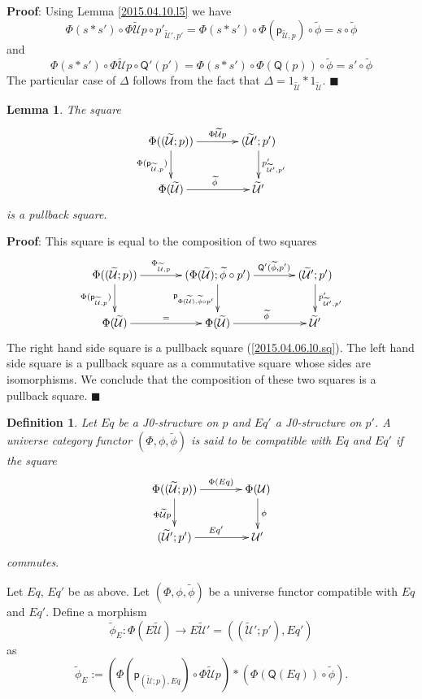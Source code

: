\documentclass[12pt]{article}
\numberwithin{equation}{section}
\newenvironment{eq}{\begin{equation}}{\end{equation}}
\newenvironment{myproof}{{\bf Proof}:}{$\blacksquare$ \vskip 5mm }
\newtheorem{lemma}[proposition]{Lemma}
\newtheorem{definition}[proposition]{Definition}
\newcommand{\sr}{\rightarrow}
\newcommand{\wt}{\widetilde}
\newcommand{\id}{1}            %
\newcommand{\p}{\mathsf{p}}
\newcommand{\U}{\mathcal{U}}
\newcommand{\Q}{\mathsf{Q}}
\begin{document}
%
\begin{myproof}
Using Lemma \ref{2015.04.10.l5} we have
%
$$\Phi(s*s')\circ \Phi\wt{\U}p\circ
p'_{\wt{\U}',p'}=\Phi(s*s')\circ\Phi(\p_{\wt{\U},p})\circ\wt{\phi}=s\circ
\wt{\phi}$$
%
and
%
$$\Phi(s*s')\circ \Phi\wt{\U}p\circ \Q'(p')=\Phi(s*s')\circ \Phi(\Q(p))\circ
\wt{\phi}=s'\circ\wt{\phi}$$
%
The particular case of $\Delta$ follows from the fact that
$\Delta=\id_{\wt{\U}}*\id_{\wt{\U}}$.
\end{myproof}
%
\begin{lemma}
\label{2015.04.06.l5} The square
%
\begin{eq}\label{2015.04.06.eq10-bis}
\begin{xy}
          \xymatrix@C=3pc{ \Phi((\wt{\U};p)) \ar[r]^-{\Phi\wt{\U}p} \ar[d]_{
              \Phi(\p_{\wt{\U},p})} & (\wt{\U}';p')
            \ar[d]^{p'_{\wt{\U}',p'}}\\ \Phi(\wt{\U}) \ar[r]^{\wt{\phi}} &
            \wt{\U}' }
\end{xy}
\end{eq}%
%
is a pullback square.
\end{lemma}
%
\begin{myproof}
This square is equal to the composition of two squares
%
$$
\begin{xy}
          \xymatrix@C=3pc{ \Phi((\wt{\U};p)) \ar[r]^-{\Phi_{\wt{\U},p}}\ar[d]_{
              \Phi(\p_{\wt{\U},p})} & (\Phi(\wt{\U});\wt{\phi}\circ p')
            \ar[r]^-{\Q'(\wt{\phi},p')}\ar[d]_{\p_{\Phi(\wt{\U}),\wt{\phi}\circ
                p'}} & (\wt{\U}';p') \ar[d]^{p'_{\wt{\U}',p'}}\\ \Phi(\wt{\U})
            \ar[r]^{=} & \Phi(\wt{\U}) \ar[r]^{\wt{\phi}} & \wt{\U}' }
\end{xy}
$$
%
The right hand side square is a pullback square (\ref{2015.04.06.l0.sq}). The
left hand side square is a pullback square as a commutative square whose sides
are isomorphisms. We conclude that the composition of these two squares is a
pullback square.
\end{myproof}
%
\begin{definition}
\label{2015.04.06.def4} Let $Eq$ be a J0-structure on $p$ and $Eq'$ a
J0-structure on $p'$. A universe category functor $(\Phi,\phi,\wt{\phi})$ is
said to be compatible with $Eq$ and $Eq'$ if the square
%
\begin{eq}\label{2015.04.06.eq6}
\begin{xy}
          \xymatrix@C=3pc{ \Phi((\wt{\U};p)) \ar[r]^-{\Phi(Eq)}
            \ar[d]_{\Phi\wt{\U}p} & \Phi(\U) \ar[d]^{\phi}\\ (\wt{\U}';p')
            \ar[r]^{Eq'} & \U' }
\end{xy}
\end{eq}%
%
commutes.
\end{definition}
%
Let $Eq$, $Eq'$ be as above. Let $(\Phi,\phi,\wt{\phi})$ be a universe functor
compatible with $Eq$ and $Eq'$. Define a morphism
%
$$\wt{\phi}_{E}:\Phi(E\wt{\U})\sr E\wt{\U}'=((\wt{\U}';p'),Eq')$$
%
as
$$\wt{\phi}_{E} := (\Phi(\p_{(\wt{\U};p),Eq})\circ \Phi\wt{\U}p)*(\Phi(\Q(Eq))\circ \wt{\phi}).$$
\end{document}
